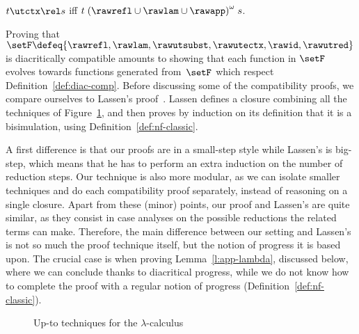 \documentclass{lmcs}
\theoremstyle{defC}
\begin{document}
\begin{lem}%
  \label{l:utctx-carac}
  $t \utctx\rel s$ iff $t \mathrel{{(\rawrefl \cup \rawlam \cup \rawapp)}^\omega}
  s$.
\end{lem}

Proving that $\setF \defeq \{ \rawrefl, \rawlam, \rawutsubst, \rawutectx,
\rawid, \rawutred\}$ is diacritically compatible amounts to showing that each
function in $\setF$ evolves towards functions generated from~$\setF$ which
respect Definition~\ref{def:diac-comp}. Before discussing some of the
compatibility proofs, we compare ourselves to Lassen's
proof~\cite{Lassen:MFPS99}. Lassen defines a closure combining all the
techniques of Figure~\ref{fig:upto-lambda}, and then proves by induction on its
definition that it is a bisimulation, using Definition~\ref{def:nf-classic}.

A first difference is that our proofs are in a small-step style while Lassen's
is big-step, which means that he has to perform an extra induction on the number
of reduction steps. Our technique is also more modular, as we can isolate
smaller techniques and do each compatibility proof separately, instead of
reasoning on a single closure. Apart from these (minor) points, our proof and
Lassen's are quite similar, as they consist in case analyses on the possible
reductions the related terms can make. Therefore, the main difference between
our setting and Lassen's is not so much the proof technique itself, but the
notion of progress it is based upon. The crucial case is when proving
Lemma~\ref{l:app-lambda}, discussed below, where we can conclude thanks to
diacritical progress, while we do not know how to complete the proof with a
regular notion of progress (Definition~\ref{def:nf-classic}).

\medskip

\begin{figure}
\caption{Up-to techniques for the $\lambda$-calculus}%
\label{fig:upto-lambda}
\end{figure}
\end{document}
